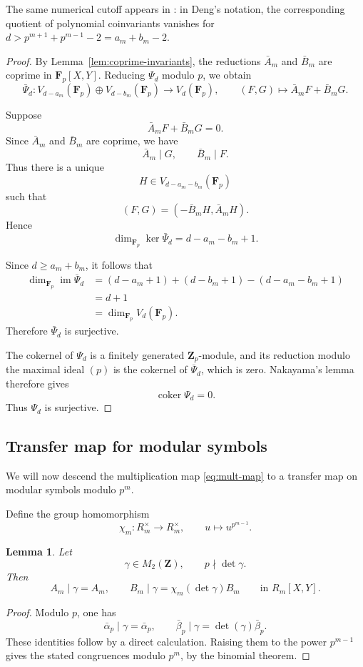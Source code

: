 \documentclass[11pt]{article}
\newcommand{\Z}{\mathbf Z}
\newcommand{\F}{\mathbf F}
\theoremstyle{plain}
\newtheorem{lemma}[theorem]{Lemma}
\theoremstyle{definition}
\theoremstyle{remark}
\numberwithin{equation}{section}
\begin{document}
The same numerical cutoff appears in \cite[Lemma~5.33]{Deng2019}: in Deng's notation, the corresponding quotient of polynomial coinvariants vanishes for \(d>p^{m+1}+p^{m-1}-2=a_m+b_m-2\).

\begin{proof} By Lemma~\ref{lem:coprime-invariants}, the reductions \(\bar A_m\) and \(\bar B_m\) are coprime in \(\F_p[X,Y]\). Reducing \(\Psi_d\) modulo \(p\), we obtain
\[\bar\Psi_d:V_{d-a_m}(\F_p)\oplus V_{d-b_m}(\F_p)\longrightarrow V_d(\F_p),\qquad (F,G)\longmapsto \bar A_mF+\bar B_mG.\]

Suppose \[\bar A_mF+\bar B_mG=0. \] Since \(\bar A_m\) and \(\bar B_m\) are coprime, we have \[\bar A_m\mid G,\qquad\bar B_m\mid F.\] Thus there is a unique \[H\in V_{d-a_m-b_m}(\F_p) \] such that \[(F,G)=(-\bar B_mH,\bar A_mH). \] Hence \[ \dim_{\F_p}\ker\bar\Psi_d = d-a_m-b_m+1.\]

Since \(d\geq a_m+b_m\), it follows that \[\begin{aligned}\dim_{\F_p}\operatorname{im}\bar\Psi_d &= (d-a_m+1)+(d-b_m+1)-(d-a_m-b_m+1)\\ &= d+1\\ &= \dim_{\F_p}V_d(\F_p).\end{aligned}\] Therefore \(\bar\Psi_d\) is surjective.

The cokernel of \(\Psi_d\) is a finitely generated \(\Z_p\)-module, and its reduction modulo the maximal ideal \((p)\) is the cokernel of \(\bar\Psi_d\), which is zero. Nakayama's lemma therefore gives \[\operatorname{coker}\Psi_d=0.\] Thus \(\Psi_d\) is surjective.
\end{proof}

\subsection{Transfer map for modular symbols}
We will now descend the multiplication map \eqref{eq:mult-map} to a transfer map on modular symbols modulo \(p^m\).

Define the group homomorphism \[\chi_m : R_m^\times \rightarrow R_m^\times, \qquad u \mapsto u^{p^{m-1}}.\]

\begin{lemma} \label{lem:dickson-transform} Let \[\gamma\in M_2(\Z),\qquad p\nmid\det\gamma.\] Then \[A_m\mid\gamma=A_m, \qquad B_m\mid\gamma = \chi_m(\det\gamma)B_m \qquad\text{in }R_m[X,Y]. \]
\end{lemma}

\begin{proof} Modulo \(p\), one has \[\bar \alpha_p\mid\gamma=\bar \alpha_p, \qquad \bar \beta_p\mid\gamma=\det(\gamma)\bar \beta_p. \] These identities follow by a direct calculation. Raising them to the power \(p^{m-1}\) gives the stated congruences modulo \(p^m\), by the binomial theorem.
\end{proof}
\end{document}
